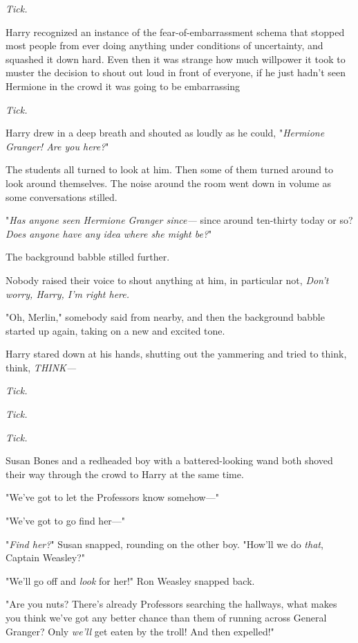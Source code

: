\emph{Tick.}

Harry recognized an instance of the fear-of-embarrassment schema that stopped
most people from ever doing anything under conditions of uncertainty, and
squashed it down hard. Even then it was strange how much willpower it took to
muster the decision to shout out loud in front of everyone, if he just hadn't
seen Hermione in the crowd it was going to be embarrassing{\el}

\emph{Tick.}

Harry drew in a deep breath and shouted as loudly as he could, "\emph{Hermione
Granger! Are you here?}"

The students all turned to look at him. Then some of them turned around to look
around themselves. The noise around the room went down in volume as some
conversations stilled.

"\emph{Has anyone seen Hermione Granger since—} since around ten-thirty today
or so? \emph{Does anyone have any idea where she might be?}"

The background babble stilled further.

Nobody raised their voice to shout anything at him, in particular not,
\emph{Don't worry, Harry, I'm right here.}

"Oh, Merlin," somebody said from nearby, and then the background babble started
up again, taking on a new and excited tone.

Harry stared down at his hands, shutting out the yammering and tried to think,
think, \emph{THINK—}

\emph{Tick.}

\emph{Tick.}

\emph{Tick.}

Susan Bones and a redheaded boy with a battered-looking wand both shoved their
way through the crowd to Harry at the same time.

"We've got to let the Professors know somehow—"

"We've got to go find her—"

"\emph{Find her?}" Susan snapped, rounding on the other boy. "How'll we do
\emph{that}, Captain Weasley?"

"We'll go off and \emph{look} for her!" Ron Weasley snapped back.

"Are you nuts? There's already Professors searching the hallways, what makes
you think we've got any better chance than them of running across General
Granger? Only \emph{we'll} get eaten by the troll! And then expelled!"

